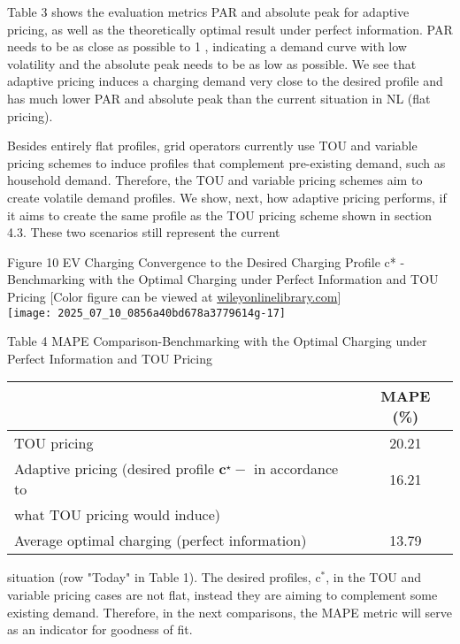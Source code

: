 \documentclass[10pt]{article}
\begin{document}
Table 3 shows the evaluation metrics PAR and absolute peak for adaptive pricing, as well as the theoretically optimal result under perfect information. PAR needs to be as close as possible to 1 , indicating a demand curve with low volatility and the absolute peak needs to be as low as possible. We see that adaptive pricing induces a charging demand very close to the desired profile and has much lower PAR and absolute peak than the current situation in NL (flat pricing).

Besides entirely flat profiles, grid operators currently use TOU and variable pricing schemes to induce profiles that complement pre-existing demand, such as household demand. Therefore, the TOU and variable pricing schemes aim to create volatile demand profiles. We show, next, how adaptive pricing performs, if it aims to create the same profile as the TOU pricing scheme shown in section 4.3. These two scenarios still represent the current

Figure 10 EV Charging Convergence to the Desired Charging Profile c* - Benchmarking with the Optimal Charging under Perfect Information and TOU Pricing [Color figure can be viewed at \href{http://wileyonlinelibrary.com}{wileyonlinelibrary.com}]\\
\texttt{[image: 2025\_07\_10\_0856a40bd678a3779614g-17]}

Table 4 MAPE Comparison-Benchmarking with the Optimal Charging under Perfect Information and TOU Pricing

\begin{center}
\begin{tabular}{lc}
\hline
 & MAPE (\%) \\
\hline
TOU pricing & 20.21 \\
Adaptive pricing (desired profile $\mathbf{c}^{\star}-$ in accordance to & 16.21 \\
what TOU pricing would induce) &  \\
Average optimal charging (perfect information) & 13.79 \\
\hline
\end{tabular}
\end{center}

situation (row "Today" in Table 1). The desired profiles, $\mathrm{c}^{*}$, in the TOU and variable pricing cases are not flat, instead they are aiming to complement some existing demand. Therefore, in the next comparisons, the MAPE metric will serve as an indicator for goodness of fit.
\end{document}
